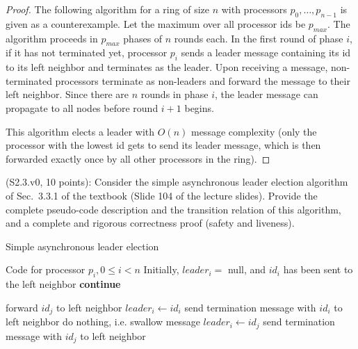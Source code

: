 \begin{proof}
The following algorithm for a ring of size $n$ with processors $p_0, \ldots, p_{n-1}$
is given as a counterexample. Let the maximum over all processor ids be $p_{max}$.
The algorithm proceeds in $p_{max}$ phases of $n$ rounds each.
In the first round of phase $i$, if it has not terminated yet,
processor $p_i$ sends a leader message containing its id
to its left neighbor and terminates as the leader. Upon receiving a message, non-terminated processors
terminate as non-leaders and forward the message to their left neighbor. Since there
are $n$ rounds in phase $i$, the leader message can propagate to all nodes before
round $i+1$ begins.

This algorithm elects a leader with $O(n)$ message complexity (only the processor with the lowest
id gets to send its leader message, which is then forwarded exactly once by all other processors in
the ring).
\end{proof}


\begin{Exc}{(S2.3.v0, 10 points):}
Consider the simple asynchronous leader election algorithm of Sec.~3.3.1 of
the textbook (Slide 104 of the lecture slides). Provide the complete
pseudo-code description and the transition relation of this algorithm,
and a complete and rigorous correctness proof (safety and liveness).
\end{Exc}

\begin{algorithm}
\caption{Simple asynchronous leader election} \label{alg:ale}
\begin{algorithmic}[1]
\Statex Code for processor $p_i, 0 \leq i < n$
\Statex Initially, $leader_i = $ null, and $id_i$ has been sent to the left neighbor
        \State \textbf{continue}
    \EndIf

        \State forward $id_j$ to left neighbor
        \State $leader_i \gets id_i$
        \State send termination message with $id_i$ to left neighbor
        \State do nothing, i.e. swallow message
        \State $leader_i \gets id_j$
        \State send termination message with $id_j$ to left neighbor
    \EndIf
\EndFor
\end{algorithmic}
\end{algorithm}

